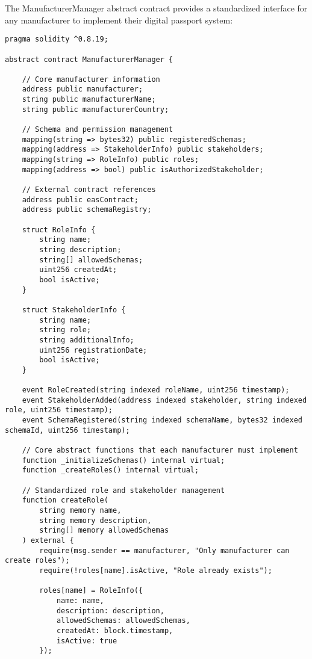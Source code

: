 \documentclass[11pt,a4paper]{article}
\begin{document}
The ManufacturerManager abstract contract provides a standardized interface for any manufacturer to implement their digital passport system:

\begin{verbatim}
pragma solidity ^0.8.19;

abstract contract ManufacturerManager {
    
    // Core manufacturer information
    address public manufacturer;
    string public manufacturerName;
    string public manufacturerCountry;
    
    // Schema and permission management
    mapping(string => bytes32) public registeredSchemas;
    mapping(address => StakeholderInfo) public stakeholders;
    mapping(string => RoleInfo) public roles;
    mapping(address => bool) public isAuthorizedStakeholder;
    
    // External contract references
    address public easContract;
    address public schemaRegistry;
    
    struct RoleInfo {
        string name;
        string description;
        string[] allowedSchemas;
        uint256 createdAt;
        bool isActive;
    }
    
    struct StakeholderInfo {
        string name;
        string role;
        string additionalInfo;
        uint256 registrationDate;
        bool isActive;
    }
    
    event RoleCreated(string indexed roleName, uint256 timestamp);
    event StakeholderAdded(address indexed stakeholder, string indexed role, uint256 timestamp);
    event SchemaRegistered(string indexed schemaName, bytes32 indexed schemaId, uint256 timestamp);
    
    // Core abstract functions that each manufacturer must implement
    function _initializeSchemas() internal virtual;
    function _createRoles() internal virtual;
    
    // Standardized role and stakeholder management
    function createRole(
        string memory name,
        string memory description,
        string[] memory allowedSchemas
    ) external {
        require(msg.sender == manufacturer, "Only manufacturer can create roles");
        require(!roles[name].isActive, "Role already exists");
        
        roles[name] = RoleInfo({
            name: name,
            description: description,
            allowedSchemas: allowedSchemas,
            createdAt: block.timestamp,
            isActive: true
        });
        

\end{verbatim}
\end{document}
